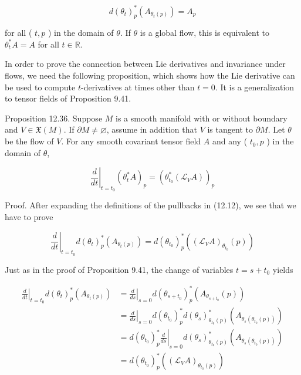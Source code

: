 \documentclass[10pt, letterpaper]{article}
\begin{document}
$$
d\left(\theta_{t}\right)_{p}^{*}\left(A_{\theta_{t}(p)}\right)=A_{p}
$$

for all ( $t, p$ ) in the domain of $\theta$. If $\theta$ is a global flow, this is equivalent to $\theta_{t}^{*} A=A$ for all $t \in \mathbb{R}$.

In order to prove the connection between Lie derivatives and invariance under flows, we need the following proposition, which shows how the Lie derivative can be used to compute $t$-derivatives at times other than $t=0$. It is a generalization to tensor fields of Proposition 9.41.

Proposition 12.36. Suppose $M$ is a smooth manifold with or without boundary and $V \in \mathfrak{X}(M)$. If $\partial M \neq \varnothing$, assume in addition that $V$ is tangent to $\partial M$. Let $\theta$ be the flow of $V$. For any smooth covariant tensor field $A$ and any ( $t_{0}, p$ ) in the domain of $\theta$,

$$
\left.\frac{d}{d t}\right|_{t=t_{0}}\left(\theta_{t}^{*} A\right)_{p}=\left(\theta_{t_{0}}^{*}\left(\mathscr{L}_{V} A\right)\right)_{p}
$$

Proof. After expanding the definitions of the pullbacks in (12.12), we see that we have to prove

$$
\left.\frac{d}{d t}\right|_{t=t_{0}} d\left(\theta_{t}\right)_{p}^{*}\left(A_{\theta_{t}(p)}\right)=d\left(\theta_{t_{0}}\right)_{p}^{*}\left(\left(\mathscr{L}_{V} A\right)_{\theta_{t_{0}}}(p)\right)
$$

Just as in the proof of Proposition 9.41, the change of variables $t=s+t_{0}$ yields

$$
\begin{aligned}
\left.\frac{d}{d t}\right|_{t=t_{0}} d\left(\theta_{t}\right)_{p}^{*}\left(A_{\theta_{t}(p)}\right) & =\left.\frac{d}{d s}\right|_{s=0} d\left(\theta_{s+t_{0}}\right)_{p}^{*}\left(A_{\theta_{s+t_{0}}}(p)\right) \\
& =\left.\frac{d}{d s}\right|_{s=0} d\left(\theta_{t_{0}}\right)_{p}^{*} d\left(\theta_{s}\right)_{\theta_{t_{0}}(p)}^{*}\left(A_{\theta_{s}\left(\theta_{t_{0}}(p)\right)}\right) \\
& =\left.d\left(\theta_{t_{0}}\right)_{p}^{*} \frac{d}{d s}\right|_{s=0} d\left(\theta_{s}\right)_{\theta_{t_{0}}(p)}^{*}\left(A_{\theta_{s}\left(\theta_{t_{0}}(p)\right)}\right) \\
& =d\left(\theta_{t_{0}}\right)_{p}^{*}\left(\left(\mathscr{L}_{V} A\right)_{\theta_{t_{0}}(p)}\right)
\end{aligned}
$$
\end{document}
